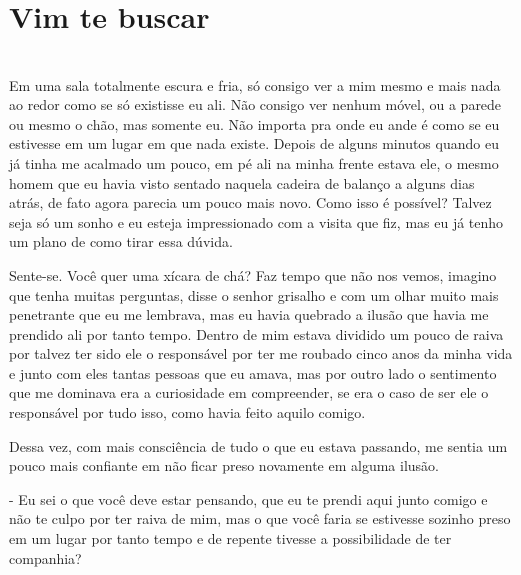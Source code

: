 
\newpage

\ifdefined\useChapters
\chapter{Vim te buscar}
\else
\chapter{}
\fi


Em uma sala totalmente escura e fria, só consigo ver a mim mesmo e mais nada ao redor como se só existisse eu ali. Não consigo ver nenhum móvel, ou a parede ou mesmo o chão, mas somente eu. Não importa pra onde eu ande é como se eu estivesse em um lugar em que nada existe. Depois de alguns minutos quando eu já tinha me acalmado um pouco, em pé ali na minha frente estava ele, o mesmo homem que eu havia visto sentado naquela cadeira de balanço a alguns dias atrás, de fato agora parecia um pouco mais novo. Como isso é possível? Talvez seja só um sonho e eu esteja impressionado com a visita que fiz, mas eu já tenho um plano de como tirar essa dúvida.

Sente-se. Você quer uma xícara de chá? Faz tempo que não nos vemos, imagino que tenha muitas perguntas, disse o senhor grisalho e com um olhar muito mais penetrante que eu me lembrava, mas eu havia quebrado a ilusão que havia me prendido ali por tanto tempo. Dentro de mim estava dividido um pouco de raiva por talvez ter sido ele o responsável por ter me roubado cinco anos da minha vida e junto com eles tantas pessoas que eu amava, mas por outro lado o sentimento que me dominava era a curiosidade em compreender, se era o caso de ser ele o responsável por tudo isso, como havia feito aquilo comigo.

Dessa vez, com mais consciência de tudo o que eu estava passando, me sentia um pouco mais confiante em não ficar preso novamente em alguma ilusão.

- Eu sei o que você deve estar pensando, que eu te prendi aqui junto comigo e não te culpo por ter raiva de mim, mas o que você faria se estivesse sozinho preso em um lugar por tanto tempo e de repente tivesse a possibilidade de ter companhia?

